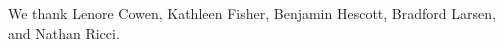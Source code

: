 \documentclass[preprint,nonatbib,blockstyle,nocopyrightspace,times]{sigplanconf}
\begin{document}
% 

\acks

We thank Lenore Cowen, Kathleen Fisher, Benjamin Hescott, Bradford Larsen, and Nathan Ricci.






\end{document}
